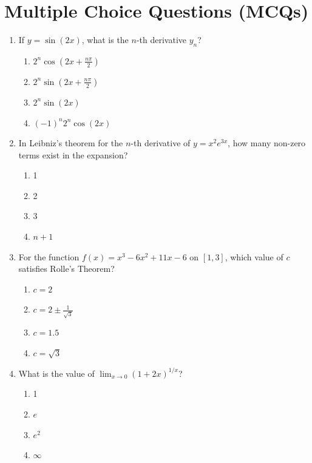 \section{Multiple Choice Questions (MCQs)}

\begin{enumerate}[leftmargin=1.5em]
    \item If $y = \sin(2x)$, what is the $n$-th derivative $y_n$?
    \begin{enumerate}[label=(\alph*)]
        \item $2^n \cos\left(2x + \frac{n\pi}{2}\right)$
        \item $2^n \sin\left(2x + \frac{n\pi}{2}\right)$
        \item $2^n \sin(2x)$
        \item $(-1)^n 2^n \cos(2x)$
    \end{enumerate}

    \item In Leibniz's theorem for the $n$-th derivative of $y = x^2 e^{3x}$, how many non-zero terms exist in the expansion?
    \begin{enumerate}[label=(\alph*)]
        \item 1
        \item 2
        \item 3
        \item $n+1$
    \end{enumerate}

    \item For the function $f(x) = x^3 - 6x^2 + 11x - 6$ on $[1, 3]$, which value of $c$ satisfies Rolle's Theorem?
    \begin{enumerate}[label=(\alph*)]
        \item $c = 2$
        \item $c = 2 \pm \frac{1}{\sqrt{3}}$
        \item $c = 1.5$
        \item $c = \sqrt{3}$
    \end{enumerate}

    \item What is the value of $\lim_{x\to 0} (1 + 2x)^{1/x}$?
    \begin{enumerate}[label=(\alph*)]
        \item 1
        \item $e$
        \item $e^2$
        \item $\infty$
    \end{enumerate}


\end{enumerate}

